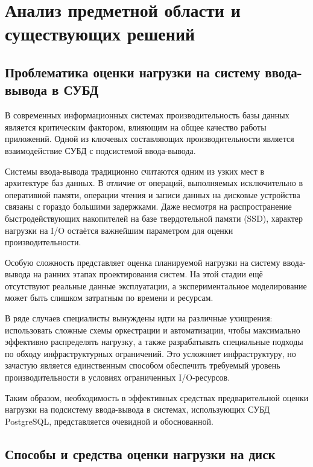 \section{Анализ предметной области и существующих решений}

\subsection{Проблематика оценки нагрузки на систему ввода-вывода в СУБД}

В современных информационных системах производительность базы данных является критическим фактором, влияющим на общее качество 
работы приложений. Одной из ключевых составляющих производительности является взаимодействие СУБД с подсистемой ввода-вывода. \cite{vershinin2023optimization}

Системы ввода-вывода традиционно считаются одним из узких мест в архитектуре баз данных. В отличие от операций, 
выполняемых исключительно в оперативной памяти, операции чтения и записи данных на дисковые устройства связаны 
с гораздо большими задержками. Даже несмотря на распространение быстродействующих накопителей на базе твердотельной памяти (SSD), 
характер нагрузки на I/O остаётся важнейшим параметром для оценки производительности. \cite{hellerstein2007architecture, malykh2022migration}

Особую сложность представляет оценка планируемой нагрузки на систему ввода-вывода на ранних этапах проектирования систем. 
На этой стадии ещё отсутствуют реальные данные эксплуатации, а экспериментальное моделирование может быть слишком затратным по времени и ресурсам.

В ряде случаев специалисты вынуждены идти на различные ухищрения: использовать сложные схемы оркестрации и автоматизации, 
чтобы максимально эффективно распределять нагрузку, а также разрабатывать специальные подходы по обходу инфраструктурных ограничений.\cite{lazarev2022, Borisova2022} 
Это усложняет инфраструктуру, но зачастую является единственным способом обеспечить требуемый уровень производительности в условиях ограниченных I/O-ресурсов. \cite{Tatarnikova2023}

Таким образом, необходимость в эффективных средствах предварительной оценки нагрузки на подсистему ввода-вывода в системах, 
использующих СУБД PostgreSQL, представляется очевидной и обоснованной.


\subsection{Способы и средства оценки нагрузки на диск} 


